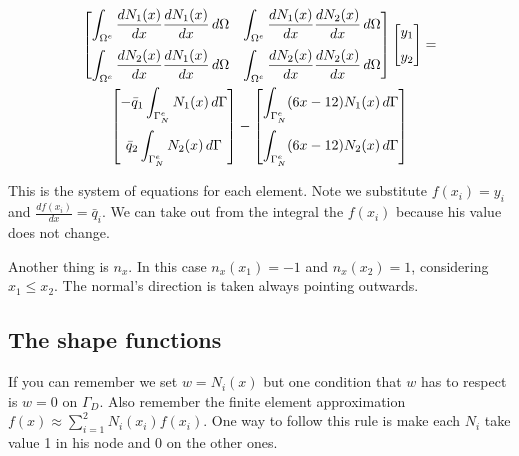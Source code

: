 \documentclass[letterpaper,10pt]{article}
\begin{document}
\begin{multline}
\begin{bmatrix}
\displaystyle
\int_{\Omega^e} \frac{d N_1(x)}{d x} \frac{d N_1(x)}{d x} \, d\Omega &
\displaystyle
\int_{\Omega^e} \frac{d N_1(x)}{d x} \frac{d N_2(x)}{d x} \, d\Omega \vspace{2mm} \\
\displaystyle
\int_{\Omega^e} \frac{d N_2(x)}{d x} \frac{d N_1(x)}{d x} \, d\Omega &
\displaystyle
\int_{\Omega^e} \frac{d N_2(x)}{d x} \frac{d N_2(x)}{d x} \, d\Omega
\end{bmatrix}
\begin{bmatrix}
y_1 \vspace{2mm}\\
y_2
\end{bmatrix}
= \\
\begin{bmatrix}
\displaystyle
-\bar{q}_1 \int_{\Gamma_N^e} N_1(x) \, d\Gamma \vspace{2mm}\\
\displaystyle
\bar{q}_2 \int_{\Gamma_N^e} N_2(x) \, d\Gamma
\end{bmatrix}
-
\begin{bmatrix}
\displaystyle
\int_{\Gamma_N^e} (6x-12) N_1(x) \, d\Gamma \vspace{2mm}\\
\displaystyle
\int_{\Gamma_N^e} (6x-12) N_2(x) \, d\Gamma
\end{bmatrix}
\label{eq:SystemEq_Element}
\end{multline}

This is the system of equations for each element. Note we substitute $f(x_i) = y_i$ and $\frac{d f(x_i)}{d x} = \bar{q}_i$. We can take out from the integral the $f(x_i)$ because his value does not change.

Another thing is $n_x$. In this case $n_x(x_1) = -1$ and $n_x(x_2)=1$, considering $x_1 \leq x_2$. The normal's direction is taken always pointing outwards.

\subsection{The shape functions}

If you can remember we set $w=N_i(x)$ but one condition that $w$ has to respect is $w=0$ on $\Gamma_D$. Also remember the finite element approximation $f(x) \approx \sum_{i=1}^2 N_i(x_i) f(x_i)$. One way to follow this rule is make each $N_i$ take value 1 in his node and 0 on the other ones.
\end{document}

